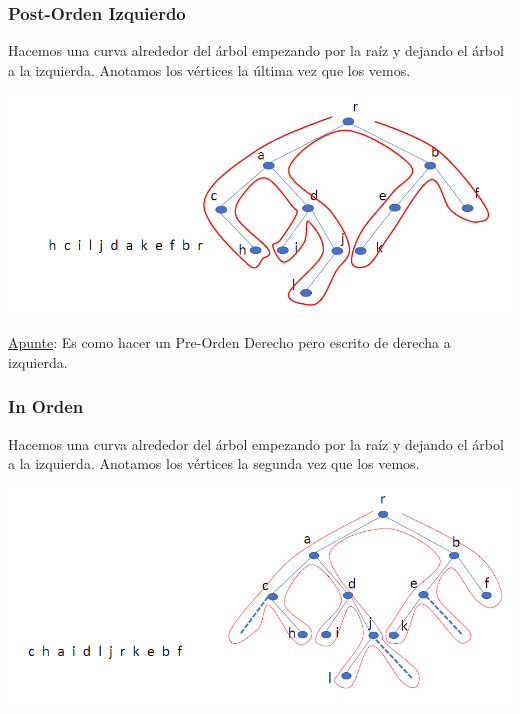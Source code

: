 \documentclass{article}
\begin{document}
\subsubsection{Post-Orden Izquierdo}
Hacemos una curva alrededor del árbol empezando por la raíz y dejando el árbol a la izquierda.
Anotamos los vértices la última vez que los vemos.
\begin{center}
    \includegraphics[width=.60\textwidth]{algPostOrdenIzq.PNG}
\end{center}
\underline{Apunte}: Es como hacer un Pre-Orden Derecho pero escrito de derecha a izquierda.

\subsubsection{In Orden}
Hacemos una curva alrededor del árbol empezando por la raíz y
dejando el árbol a la izquierda. Anotamos los vértices la segunda vez que los
vemos.
\begin{center}
    \includegraphics[width=.60\textwidth]{algInOrden.PNG}
\end{center}
\end{document}

